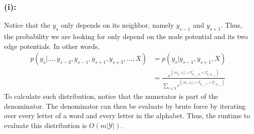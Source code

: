 \documentclass[11pt]{report}
\begin{document}
\subsubsection*{(i):} Notice that the $y_s$ only depends on its neighbor, namely $y_{s-1}$ and $y_{s+1}$. Thus, the probability we are looking for only depend on the node potential and its two edge potentials. In other words,
\begin{align*}
    p(y_s|\ldots, y_{s-3}, y_{s-1}, y_{s+1}, y_{s+3}, \ldots, X) &= p(y_s|y_{s-1}, y_{s+1}, X) \\
    &= \frac{e^{(\langle w_{y_s}, x_s \rangle + T_{y_{s-1}, y_s} + T_{y_s, y_{s+1}})}}{\sum_{c \in \mathcal{Y}} e^{(\langle w_c, x_s \rangle + T_{y_{s-1}, c} + T_{c, y_{s+1}})}}
\end{align*}
To calculate such distribution, notice that the numerator is part of the denominator. The denominator can then be evaluate by brute force by iterating over every letter of a word and every letter in the alphabet. Thus, the runtime to evaluate this distribution is $O(m|\mathcal{Y}|)$.
\end{document}
